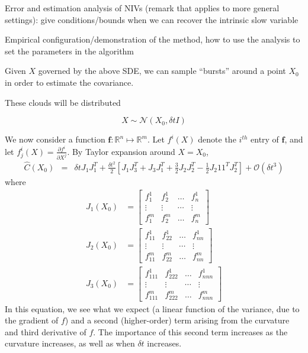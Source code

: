 \documentclass[1p]{elsarticle}
\begin{document}
Error and estimation analysis of NIVs (remark that applies to more general settings): give conditions/bounds when we can recover the intrinsic slow variable

Empirical configuration/demonstration of the method, how to use the analysis to set the parameters in the algorithm


Given $X$ governed by the above SDE, we can sample ``bursts'' around a point $X_0$ in order to estimate the covariance. 

These clouds will be distributed 

\begin{equation}
X \sim \mathcal{N}\left( X_0, \delta t I \right)
\end{equation}


We now consider a function $\mathbf{f}: \mathbb{R}^n \mapsto \mathbb{R}^m$.
%
Let $f^i(X)$ denote the $i^{th}$ entry of $\mathbf{f}$, and let $f^i_j(X) = \frac{\partial f^i}{\partial X^j}$.
%
By Taylor expansion around $X=X_0$,
%
\begin{eqnarray}
\hat{C}(X_0) &=& \delta t J_1 J_1^T 
+ \frac{\delta t^2}{2} \left[ J_1 J_3^T + J_3 J_1^T  
+ \frac{3}{2} J_2 J_2^T 
-\frac{1 }{2} J_2 1 1^T J_2^T \right]
+ \mathcal{O} (\delta t^3) %
\end{eqnarray}
where
\begin{equation}
\begin{aligned}
J_1(X_0) &= \begin{bmatrix}
f_1^1 & f_2^1 & \dots & f_n^1 \\
\vdots & \vdots & \cdots & \vdots \\
f_1^m & f_2^m & \dots & f_n^m
\end{bmatrix}\\
%
J_2(X_0) &= \begin{bmatrix}
f_{11}^1 & f_{22}^1 & \dots & f_{nn}^1 \\
\vdots & \vdots & \cdots & \vdots \\
f_{11}^m & f_{22}^m & \dots & f_{nn}^m
\end{bmatrix}\\
%
J_3(X_0) &= \begin{bmatrix}
f_{111}^1 & f_{222}^1 & \dots & f_{nnn}^1 \\
\vdots & \vdots & \cdots & \vdots \\
f_{111}^m & f_{222}^m & \dots & f_{nnn}^m
\end{bmatrix}
\end{aligned}
\end{equation}
%
In this equation, we see what we expect (a linear function of the variance, due to the gradient of $f$) and a second (higher-order) term arising from the curvature and third derivative of $f$.
%
The importance of this second term increases as the curvature increases, as well as when $\delta t$ increases. 
\end{document}

